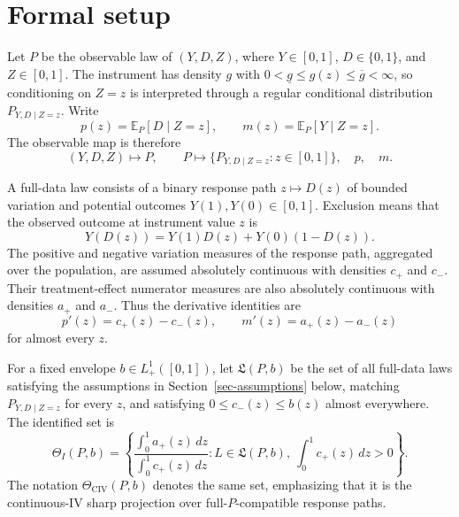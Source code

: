 \documentclass[11pt]{article}
\newcommand{\E}{\mathbb{E}}
\theoremstyle{definition}
\theoremstyle{plain}
\theoremstyle{remark}
\begin{document}
\section{Formal setup}
Let \(P\) be the observable law of \((Y,D,Z)\), where \(Y\in[0,1]\),
\(D\in\{0,1\}\), and \(Z\in[0,1]\).  The instrument has density \(g\) with
\(0<\underline g\le g(z)\le \overline g<\infty\), so conditioning on \(Z=z\)
is interpreted through a regular conditional distribution \(P_{Y,D\mid Z=z}\).
Write
\[
p(z)=\E_P[D\mid Z=z],
\qquad
m(z)=\E_P[Y\mid Z=z].
\]
The observable map is therefore
\[
(Y,D,Z)\mapsto P,\qquad
P\mapsto \{P_{Y,D\mid Z=z}:z\in[0,1]\},\quad p,\quad m.
\]

A full-data law consists of a binary response path \(z\mapsto D(z)\) of bounded
variation and potential outcomes \(Y(1),Y(0)\in[0,1]\).  Exclusion means that
the observed outcome at instrument value \(z\) is
\[
Y(D(z))=Y(1)D(z)+Y(0)(1-D(z)).
\]
The positive and negative variation measures of the response path, aggregated
over the population, are assumed absolutely continuous with densities
\(c_+\) and \(c_-\).  Their treatment-effect numerator measures are also
absolutely continuous with densities \(a_+\) and \(a_-\).  Thus the derivative
identities are
\[
p'(z)=c_+(z)-c_-(z),
\qquad
m'(z)=a_+(z)-a_-(z)
\]
for almost every \(z\).

For a fixed envelope \(b\in L^1_+([0,1])\), let \(\mathfrak L(P,b)\) be the set
of all full-data laws satisfying the assumptions in Section~\ref{sec-assumptions}
below, matching \(P_{Y,D\mid Z=z}\) for every \(z\), and satisfying
\(0\le c_-(z)\le b(z)\) almost everywhere.  The identified set is
\[
\Theta_I(P,b)
=
\left\{
\frac{\int_0^1 a_+(z)\,dz}{\int_0^1 c_+(z)\,dz}
:
L\in\mathfrak L(P,b),\ \int_0^1 c_+(z)\,dz>0
\right\}.
\]
The notation \(\Theta_{\mathrm{CIV}}(P,b)\) denotes the same set, emphasizing
that it is the continuous-IV sharp projection over full-\(P\)-compatible
response paths.
\end{document}
